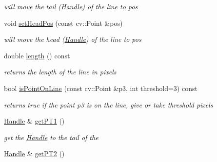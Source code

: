 \begin{DoxyCompactItemize}
\begin{DoxyCompactList}\small\item\em will move the tail (\hyperlink{classcanvascv_1_1Handle}{Handle}) of the line to pos \end{DoxyCompactList}\item 
void \hyperlink{classcanvascv_1_1Line_a0aa66e5c23a5c1173786f6c7c9519bfa}{set\+Head\+Pos} (const cv\+::\+Point \&pos)\hypertarget{classcanvascv_1_1Line_a0aa66e5c23a5c1173786f6c7c9519bfa}{}\label{classcanvascv_1_1Line_a0aa66e5c23a5c1173786f6c7c9519bfa}

\begin{DoxyCompactList}\small\item\em will move the head (\hyperlink{classcanvascv_1_1Handle}{Handle}) of the line to pos \end{DoxyCompactList}\item 
double \hyperlink{classcanvascv_1_1Line_a7a076a5ac4f7f4aa99e0323daa04677c}{length} () const \hypertarget{classcanvascv_1_1Line_a7a076a5ac4f7f4aa99e0323daa04677c}{}\label{classcanvascv_1_1Line_a7a076a5ac4f7f4aa99e0323daa04677c}

\begin{DoxyCompactList}\small\item\em returns the length of the line in pixels \end{DoxyCompactList}\item 
bool \hyperlink{classcanvascv_1_1Line_a4b7e7bc0c752743768e9d0e850c27288}{is\+Point\+On\+Line} (const cv\+::\+Point \&p3, int threshold=3) const \hypertarget{classcanvascv_1_1Line_a4b7e7bc0c752743768e9d0e850c27288}{}\label{classcanvascv_1_1Line_a4b7e7bc0c752743768e9d0e850c27288}

\begin{DoxyCompactList}\small\item\em returns true if the point \textquotesingle{}p3\textquotesingle{} is on the line, give or take \textquotesingle{}threshold\textquotesingle{} pixels \end{DoxyCompactList}\item 
\hyperlink{classcanvascv_1_1Handle}{Handle} \& \hyperlink{classcanvascv_1_1Line_a685abcca89d05c63186ef71c0ef8b0a2}{get\+P\+T1} ()\hypertarget{classcanvascv_1_1Line_a685abcca89d05c63186ef71c0ef8b0a2}{}\label{classcanvascv_1_1Line_a685abcca89d05c63186ef71c0ef8b0a2}

\begin{DoxyCompactList}\small\item\em get the \hyperlink{classcanvascv_1_1Handle}{Handle} to the tail of the \end{DoxyCompactList}\item 
\hyperlink{classcanvascv_1_1Handle}{Handle} \& \hyperlink{classcanvascv_1_1Line_a7a0fc9d06ab0fc575b1596068dff0484}{get\+P\+T2} ()\hypertarget{classcanvascv_1_1Line_a7a0fc9d06ab0fc575b1596068dff0484}{}\label{classcanvascv_1_1Line_a7a0fc9d06ab0fc575b1596068dff0484}


\end{DoxyCompactItemize}
